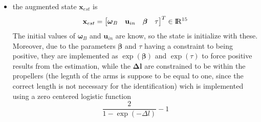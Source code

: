 \begin{itemize}
	\item the augmented state $\mathbf{x}_{est}$ is
	\begin{equation}
		\mathbf{x}_{est}=
		\begin{bmatrix}
			\boldsymbol{\omega}_B & \mathbf{u}_{in} & \boldsymbol{\beta} & \tau
		\end{bmatrix}^T
		\in \rm I\!R^{15}
		\label{eq:augmentedState}
	\end{equation} 
	The initial values of $\boldsymbol{\omega}_B$ and $\mathbf{u}_{in}$ are know, so the state is initialize with these. Moreover, due to the parameters $\boldsymbol{\beta}$ and $\tau$ having a constraint to being positive, they are implemented as $\exp(\boldsymbol{\beta})$ and $\exp(\tau)$ to force positive results from the estimation, while the $\boldsymbol{\Delta l}$ are constrained to be within the propellers (the legnth of the arms is suppose to be equal to one, since the correct length is not necessary for the identification) wich is implemented using a zero centered logistic function
	\begin{equation}
		\frac{2}{1-\exp(-\Delta l)} -1
		\label{eq:logisticFunction}
	\end{equation}


\end{itemize}

